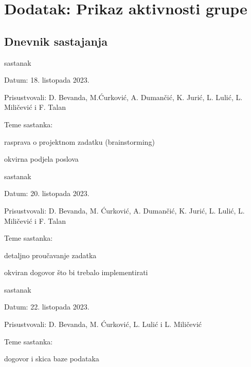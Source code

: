 \chapter*{Dodatak: Prikaz aktivnosti grupe}

		\section*{Dnevnik sastajanja}


		\begin{packed_enum}
			\item  sastanak

			\item[] \begin{packed_item}
				\item Datum: 18. listopada 2023.
				\item Prisustvovali: D. Bevanda, M.Ćurković, A. Dumančić, K. Jurić, L. Lulić, L. Miličević i F. Talan
				\item Teme sastanka:
				\begin{packed_item}
					\item  rasprava o projektnom zadatku (brainstorming)
					\item  okvirna podjela poslova
				\end{packed_item}
			\end{packed_item}

			\item  sastanak
			\item[] \begin{packed_item}
				\item Datum: 20. listopada 2023.
				\item Prisustvovali: D. Bevanda, M. Ćurković, A. Dumančić, K. Jurić, L. Lulić, L. Miličević i F. Talan
				\item Teme sastanka:
				\begin{packed_item}
					\item  detaljno proučavanje zadatka
					\item  okviran dogovor što bi trebalo implementirati
				\end{packed_item}
			\end{packed_item}

            \item  sastanak
			\item[] \begin{packed_item}
				\item Datum: 22. listopada 2023.
				\item Prisustvovali: D. Bevanda, M. Ćurković, L. Lulić i L. Miličević
				\item Teme sastanka:
				\begin{packed_item}
					\item  dogovor i skica baze podataka
				\end{packed_item}
			\end{packed_item}


\end{packed_enum}
